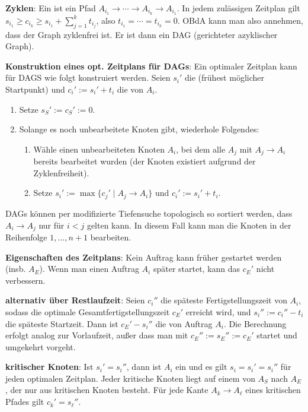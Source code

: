 \textbf{Zyklen}:
Ein  ist ein Pfad $A_{i_1} \to \dotsb \to A_{i_k} \to A_{i_1}$.
In jedem zulässigen Zeitplan gilt $s_{i_1} \ge c_{i_k} \ge s_{i_1} + \sum_{j=1}^k t_{i_j}$,
also $t_{i_1} = \dotsb = t_{i_k} = 0$.
OBdA kann man also annehmen, dass der Graph zyklenfrei ist.
Er ist dann ein DAG (gerichteter azyklischer Graph).

\linie
\pagebreak

\textbf{Konstruktion eines opt. Zeitplans für DAGs}:
Ein optimaler Zeitplan kann für DAGS wie folgt konstruiert werden.
Seien $s_i'$ die  (frühest möglicher Startpunkt) und
$c_i' := s_i' + t_i$ die  von $A_i$.
\begin{enumerate}
    \item
    Setze $s_S' := c_S' := 0$.

    \item
    Solange es noch unbearbeitete Knoten gibt, wiederhole Folgendes:
    \begin{enumerate}
        \item
        Wähle einen unbearbeiteten Knoten $A_i$, bei dem alle $A_j$ mit $A_j \to A_i$
        bereits bearbeitet wurden
        (der Knoten existiert aufgrund der Zyklenfreiheit).

        \item
        Setze $s_i' := \max\{c_j' \;|\; A_j \to A_i\}$ und $c_i' := s_i' + t_i$.
    \end{enumerate}
\end{enumerate}
DAGs können per modifizierte Tiefensuche topologisch so sortiert werden, dass
$A_i \to A_j$ nur für $i < j$ gelten kann.
In diesem Fall kann man die Knoten in der Reihenfolge $1, \dotsc, n + 1$ bearbeiten.

\textbf{Eigenschaften des Zeitplans}:
Kein Auftrag kann früher gestartet werden (insb. $A_E$).
Wenn man einen Auftrag $A_i$ später startet, kann das $c_E'$ nicht verbessern.

\textbf{alternativ über Restlaufzeit}:
Seien $c_i''$ die späteste Fertigstellungszeit von $A_i$, sodass die optimale
Gesamtfertigstellungszeit $c_E'$ erreicht wird, und $s_i'' := c_i'' - t_i$ die späteste
Startzeit.
Dann ist $c_E' - s_i''$ die  von Auftrag $A_i$.
Die Berechnung erfolgt analog zur Vorlaufzeit, außer dass man mit
$c_E'' := s_E'' := c_E'$ startet und umgekehrt vorgeht.

\linie

\textbf{kritischer Knoten}:
Ist $s_i' = s_i''$, dann ist $A_i$ ein 
und es gilt $s_i = s_i' = s_i''$ für jeden optimalen Zeitplan.
Jeder kritische Knoten liegt auf einem  von $A_S$ nach $A_E$, der nur aus
kritischen Knoten besteht.
Für jede Kante $A_k \to A_\ell$ eines kritischen Pfades gilt $c_k' = s_\ell''$.

